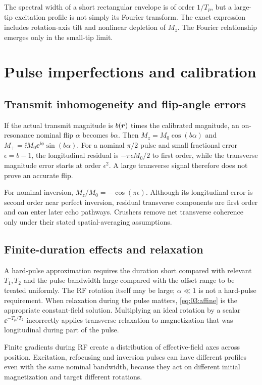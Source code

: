 The spectral width of a short rectangular envelope is of order $1/T_p$,
but a large-tip excitation profile is not simply its Fourier transform.
The exact expression includes rotation-axis tilt and nonlinear depletion
of $M_z$. The Fourier relationship emerges only in the small-tip limit.

\section{Pulse imperfections and calibration}
\label{sec:04:pulse-imperfections-and-calibration}
\subsection{Transmit inhomogeneity and flip-angle errors}
If the actual transmit magnitude is $b(\bm{r})$ times the calibrated
magnitude, an on-resonance nominal flip $\alpha$ becomes $b\alpha$.
Then $M_z=M_0\cos(b\alpha)$ and
$M_+=\ii M_0\ee^{\ii\phi}\sin(b\alpha)$.
For a nominal $\pi/2$ pulse and small fractional error $\epsilon=b-1$,
the longitudinal residual is $-\pi\epsilon M_0/2$ to first order,
while the transverse magnitude error starts at order $\epsilon^2$.
A large transverse signal therefore does not prove an accurate flip.

For nominal inversion, $M_z/M_0=-\cos(\pi\epsilon)$.
Although its longitudinal error is second order near perfect inversion,
residual transverse components are first order and can enter later
echo pathways. Crushers remove net transverse coherence only under
their stated spatial-averaging assumptions.

\subsection{Finite-duration effects and relaxation}
A hard-pulse approximation requires the duration short compared with
relevant $T_1,T_2$ and the pulse bandwidth large compared with the
offset range to be treated uniformly.
The RF rotation itself may be large; $\alpha\ll1$ is not a hard-pulse
requirement. When relaxation during the pulse matters,
\cref{eq:03:affine} is the appropriate constant-field solution.
Multiplying an ideal rotation by a scalar $\ee^{-T_p/T_2}$ incorrectly
applies transverse relaxation to magnetization that was longitudinal
during part of the pulse.

Finite gradients during RF create a distribution of effective-field axes
across position. Excitation, refocusing and inversion pulses can have
different profiles even with the same nominal bandwidth, because they
act on different initial magnetization and target different rotations.

